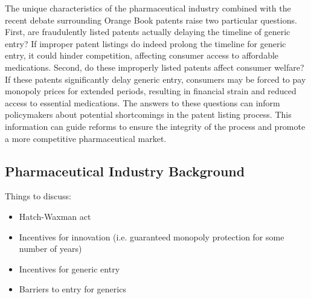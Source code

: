 \documentclass[12pt,a4paper]{article}
\begin{document}
\par The unique characteristics of the pharmaceutical industry combined with the recent debate surrounding Orange Book patents raise two particular questions. First, are fraudulently listed patents actually delaying the timeline of generic entry? If improper patent listings do indeed prolong the timeline for generic entry, it could hinder competition, affecting consumer access to affordable medications. Second, do these improperly listed patents affect consumer welfare? If these patents significantly delay generic entry, consumers may be forced to pay monopoly prices for extended periods, resulting in financial strain and reduced access to essential medications. The answers to these questions can inform policymakers about potential shortcomings in the patent listing process. This information can guide reforms to ensure the integrity of the process and promote a more competitive pharmaceutical market.

\subsection{Pharmaceutical Industry Background}

Things to discuss:
\begin{itemize}
    \item Hatch-Waxman act
    \item Incentives for innovation (i.e. guaranteed monopoly protection for some number of years)
    \item Incentives for generic entry
    \item Barriers to entry for generics
\end{itemize}

\vskip0.2in
\end{document}
